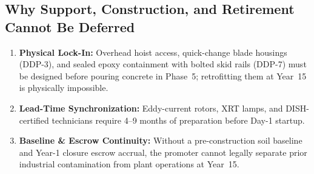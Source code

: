 \subsection{Why Support, Construction, and Retirement Cannot Be Deferred}
\begin{enumerate}
    \item \textbf{Physical Lock-In:} Overhead hoist access, quick-change blade housings (DDP-3), and sealed epoxy containment with bolted skid rails (DDP-7) must be designed before pouring concrete in Phase~5; retrofitting them at Year~15 is physically impossible.
    \item \textbf{Lead-Time Synchronization:} Eddy-current rotors, XRT lamps, and DISH-certified technicians require 4--9 months of preparation before Day-1 startup.
    \item \textbf{Baseline \& Escrow Continuity:} Without a pre-construction soil baseline and Year-1 closure escrow accrual, the promoter cannot legally separate prior industrial contamination from plant operations at Year~15.
\end{enumerate}
